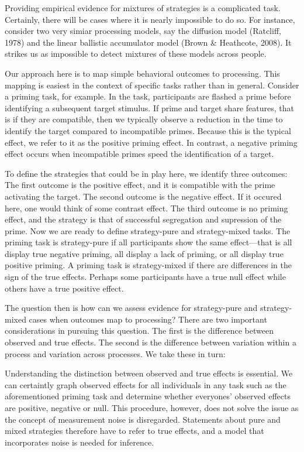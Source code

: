 \documentclass[english,man]{apa6}
\theoremstyle{definition}
\theoremstyle{definition}
\theoremstyle{remark}
\begin{document}
Providing empirical evidence for mixtures of strategies is a complicated
task. Certainly, there will be cases where it is nearly impossible to do
so. For instance, consider two very simiar processing models, say the
diffusion model (Ratcliff, 1978) and the linear ballistic accumulator
model (Brown \& Heathcote, 2008). It strikes us as impossible to detect
mixtures of these models across people.

Our approach here is to map simple behavioral outcomes to processing.
This mapping is easiest in the context of specific tasks rather than in
general. Consider a priming task, for example. In the task, participants
are flashed a prime before identifying a subsequent target stimulus. If
prime and target share features, that is if they are compatible, then we
typically observe a reduction in the time to identify the target
compared to incompatible primes. Because this is the typical effect, we
refer to it as the positive priming effect. In contrast, a negative
priming effect occurs when incompatible primes speed the identification
of a target.

To define the strategies that could be in play here, we identify three
outcomes: The first outcome is the positive effect, and it is compatible
with the prime activating the target. The second outcome is the negative
effect. If it occured here, one would think of some contrast effect. The
third outcome is no priming effect, and the strategy is that of
successful segregation and supression of the prime. Now we are ready to
define strategy-pure and strategy-mixed tasks. The priming task is
strategy-pure if all participants show the same effect---that is all
display true negative priming, all display a lack of priming, or all
display true positive priming. A priming task is strategy-mixed if there
are differences in the sign of the true effects. Perhaps some
participants have a true null effect while others have a true positive
effect.

The question then is how can we assess evidence for strategy-pure and
strategy-mixed cases when outcomes map to processing? There are two
important considerations in pursuing this question. The first is the
difference between observed and true effects. The second is the
difference between variation within a process and variation across
processes. We take these in turn:

Understanding the distinction between observed and true effects is
essential. We can certaintly graph observed effects for all individuals
in any task such as the aforementioned priming task and determine
whether everyones' observed effects are positive, negative or null. This
procedure, however, does not solve the issue as the concept of
measurement noise is disregarded. Statements about pure and mixed
strategies therefore have to refer to true effects, and a model that
incorporates noise is needed for inference.
\end{document}
